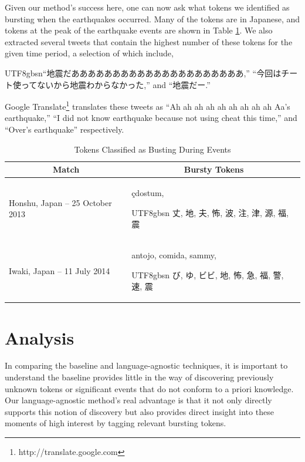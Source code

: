 \documentclass{sig-alternate}
\newcommand{\myfont}{gbsn}
\begin{document}
Given our method's success here, one can now ask what tokens we identified as bursting when the earthquakes occurred.
Many of the tokens are in Japanese, and tokens at the peak of the earthquake events are shown in Table \ref{tab:japanTokens}.
We also extracted several tweets that contain the highest number of these tokens for the given time period, a selection of which include, \begin{CJK}{UTF8}{\myfont}``地震だあああああああああああああああああああああ,'' ``今回はチート使ってないから地震わからなかった,'' and ``地震だー.'' \end{CJK}
Google Translate\footnote{http://translate.google.com} translates these tweets as ``Ah ah ah ah ah ah ah ah ah Aa's earthquake,'' ``I did not know earthquake because not using cheat this time,'' and ``Over's earthquake'' respectively.
%
\begin{table}[htdp]
\caption{Tokens Classified as Busting During Events}
\begin{center}
\begin{tabular}{|p{1.45in} | p{1.45in} |}
\hline
\multicolumn{1}{|c|}{\textbf{Match}} & \multicolumn{1}{|c|}{\textbf{Bursty Tokens}} \\ \hline
Honshu, Japan -- 25 October 2013 & \c{c}dostum, \begin{CJK}{UTF8}{\myfont} 丈, 地, 夫, 怖, 波, 注, 津, 源, 福, 震 \end{CJK} \\ \hline
Iwaki, Japan -- 11 July 2014 & antojo, comida, sammy, \begin{CJK}{UTF8}{\myfont} び, ゆ, ビビ, 地, 怖, 急, 福, 警, 速, 震 \end{CJK} \\ \hline
\end{tabular}
\end{center}
\label{tab:japanTokens}
\end{table}

\section{Analysis}
\label{sect:analysis}

In comparing the baseline and language-agnostic techniques, it is important to understand the baseline provides little in the way of discovering previously unknown tokens or significant events that do not conform to a priori knowledge.
Our language-agnostic method's real advantage is that it not only directly supports this notion of discovery but also provides direct insight into these moments of high interest by tagging relevant bursting tokens.
\end{document}
